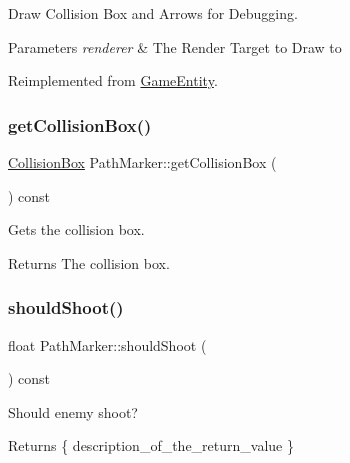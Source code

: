 Draw Collision Box and Arrows for Debugging. 


\begin{DoxyParams}{Parameters}
{\em renderer} & The Render Target to Draw to \\
\hline
\end{DoxyParams}


Reimplemented from \mbox{\hyperlink{class_game_entity_ae8417c4fa668594827706c44091f7366}{Game\+Entity}}.

\mbox{\label{class_path_marker_aff1668ccb59dea30e37e6207c3c18e84}} 
\subsubsection{\texorpdfstring{getCollisionBox()}{getCollisionBox()}}
{\footnotesize\ttfamily \mbox{\hyperlink{class_collision_box}{Collision\+Box}} Path\+Marker\+::get\+Collision\+Box (\begin{DoxyParamCaption}{ }\end{DoxyParamCaption}) const\hspace{0.3cm}{\ttfamily [inline]}}



Gets the collision box. 

\begin{DoxyReturn}{Returns}
The collision box. 
\end{DoxyReturn}
\mbox{\label{class_path_marker_acf1d0c86376d89b82cc669390e173436}} 
\subsubsection{\texorpdfstring{shouldShoot()}{shouldShoot()}}
{\footnotesize\ttfamily float Path\+Marker\+::should\+Shoot (\begin{DoxyParamCaption}{ }\end{DoxyParamCaption}) const\hspace{0.3cm}{\ttfamily [inline]}}



Should enemy shoot? 

\begin{DoxyReturn}{Returns}
\{ description\+\_\+of\+\_\+the\+\_\+return\+\_\+value \} 
\end{DoxyReturn}
\mbox{\label{class_path_marker_a212b9b719c54d2fae7e9e0b89577d24a}} 

